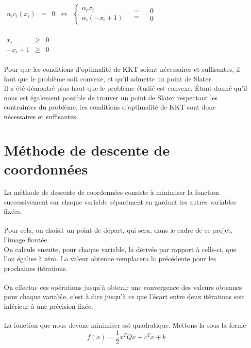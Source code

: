 \documentclass[12pt, a4paper]{report}
\begin{document}
\begin{center}
$\begin{array}{rclcrll}
\alpha_i c_i(x_i) & = & 0 & \Leftrightarrow & \left\{\begin{array}{l} \alpha_i x_i \\ \alpha_i(- x_i +1)\end{array}\right. & \begin{array}{c} = \\ = \end{array} & \begin{array}{l} 0 \\ 0 \end{array}\\
\end{array}$
\end{center}

\begin{center}
$\begin{array}{rcl}
x_i & \geq & 0 \\
-x_i + 1 & \geq & 0 \\
\end{array}$
\end{center}
\noindent
Pour que les conditions d'optimalité de KKT soient nécessaires et suffisantes, il faut que le problème soit convexe, et qu'il admette un point de Slater.\\
Il a été démontré plus haut que le problème étudié est convexe. Étant donné qu'il nous est également possible de trouver un point de Slater respectant les contraintes du problème, les conditions d'optimalité de KKT sont donc nécessaires et suffisantes.
 
\section{Méthode de descente de coordonnées}
La méthode de descente de coordonnées consiste à minimiser la fonction successivement sur chaque variable séparément en gardant les autres variables fixées.\\
\\Pour cela, on choisit un point de départ, qui sera, dans le cadre de ce projet, l'image floutée.\\
On calcule ensuite, pour chaque variable, la dérivée par rapport à celle-ci, que l'on égalise à zéro. La valeur obtenue remplacera la précédente pour les prochaines itérations. \\
\\On effectue ces opérations jusqu'à obtenir une convergence des valeurs obtenues pour chaque variable, c'est à dire jusqu'à ce que l'écart entre deux itérations soit inférieur à une précision fixée. \\
\\La fonction que nous devons minimiser est quadratique. Mettons-la sous la forme \[f(x) = \dfrac{1}{2}x^TQx + c^Tx + b\]
\end{document}
